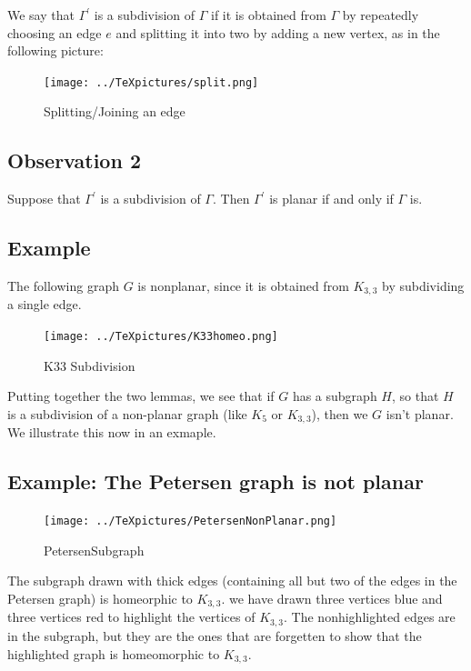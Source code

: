 \documentclass[]{article}
\begin{document}
We say that \(\Gamma^\prime\) is a subdivision of \(\Gamma\) if it is
obtained from \(\Gamma\) by repeatedly choosing an edge \(e\) and
splitting it into two by adding a new vertex, as in the following
picture:

\begin{figure}[htbp]
\centering
\texttt{[image: ../TeXpictures/split.png]}
\caption{Splitting/Joining an edge}
\end{figure}

\subsection{Observation 2}\label{observation-2}

Suppose that \(\Gamma^\prime\) is a subdivision of \(\Gamma\). Then
\(\Gamma^\prime\) is planar if and only if \(\Gamma\) is.

\subsection{Example}\label{example-8}

The following graph \(G\) is nonplanar, since it is obtained from
\(K_{3,3}\) by subdividing a single edge.

\begin{figure}[htbp]
\centering
\texttt{[image: ../TeXpictures/K33homeo.png]}
\caption{K33 Subdivision}
\end{figure}

Putting together the two lemmas, we see that if \(G\) has a subgraph
\(H\), so that \(H\) is a subdivision of a non-planar graph (like
\(K_5\) or \(K_{3,3}\)), then we \(G\) isn't planar. We illustrate this
now in an exmaple.

\subsection{Example: The Petersen graph is not
planar}\label{example-the-petersen-graph-is-not-planar}

\begin{figure}[htbp]
\centering
\texttt{[image: ../TeXpictures/PetersenNonPlanar.png]}
\caption{PetersenSubgraph}
\end{figure}

The subgraph drawn with thick edges (containing all but two of the edges
in the Petersen graph) is homeorphic to \(K_{3,3}\). we have drawn three
vertices blue and three vertices red to highlight the vertices of
\(K_{3,3}\). The nonhighlighted edges are in the subgraph, but they are
the ones that are forgetten to show that the highlighted graph is
homeomorphic to \(K_{3,3}\).
\end{document}
